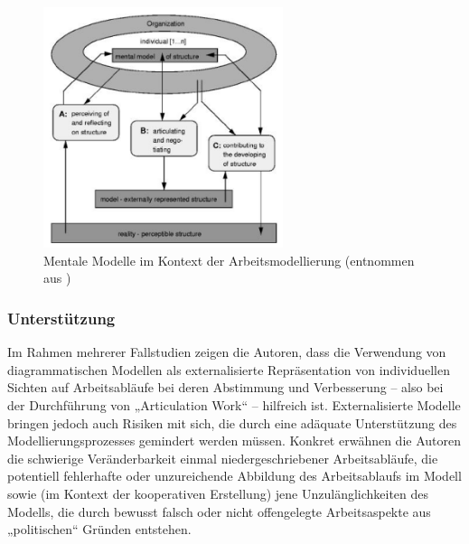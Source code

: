 \begin{figure}[htbp]
	\centering
		\includegraphics[width=7cm]{img/MentaleModelle/herrmann_levels_of_structure.png}
	\caption[Mentale Modelle im Kontext der Arbeitsmodellierung]{Mentale Modelle im Kontext der Arbeitsmodellierung (entnommen aus \citep{Herrmann02})}
	\label{fig:img_MentaleModelle_herrmann_levels_of_structure}
\end{figure}

\subsubsection{Unterstützung}

Im Rahmen mehrerer Fallstudien zeigen die Autoren, dass die Verwendung von diagrammatischen Modellen als externalisierte Repräsentation von individuellen Sichten auf Arbeitsabläufe bei deren Abstimmung und Verbesserung -- also bei der Durchführung von „Articulation Work“ -- hilfreich ist. Externalisierte Modelle bringen jedoch auch Risiken mit sich, die durch eine adäquate Unterstützung des Modellierungsprozesses gemindert werden müssen. Konkret erwähnen die Autoren die schwierige Veränderbarkeit einmal niedergeschriebener Arbeitsabläufe, die potentiell fehlerhafte oder unzureichende Abbildung des Arbeitsablaufs im Modell sowie (im Kontext der kooperativen Erstellung) jene Unzulänglichkeiten des Modells, die durch bewusst falsch oder nicht offengelegte Arbeitsaspekte aus „politischen“ Gründen entstehen.

